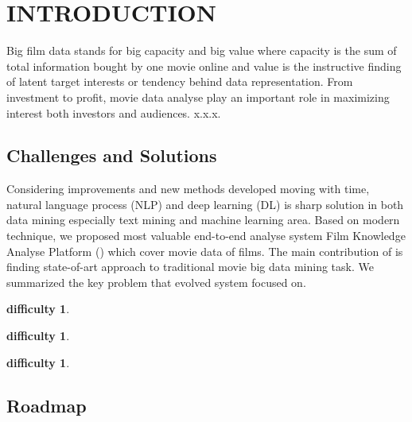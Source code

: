 \section{INTRODUCTION}
\par Big film data stands for big capacity and big value where capacity is the sum of total information bought by one movie online and value is the instructive finding of latent target interests or tendency behind data representation. From investment to profit, movie data analyse play an important role in maximizing interest both investors and audiences. x.x.x.

\subsection{Challenges and Solutions}
Considering improvements and new methods developed moving with time, natural language process (NLP) and deep learning (DL) is sharp solution in both data mining especially text mining and machine learning area. Based on modern technique, we proposed most valuable end-to-end analyse system Film Knowledge Analyse Platform (\system) which cover movie data of films. The main contribution of \system is finding state-of-art approach to traditional movie big data mining task. We summarized the key problem that evolved system \system focused on.
\newtheorem{difficulties}[theorem]{difficulty}
\begin{difficulties} \end{difficulties}
\begin{difficulties} \end{difficulties}
\begin{difficulties} \end{difficulties}

\subsection{Roadmap}